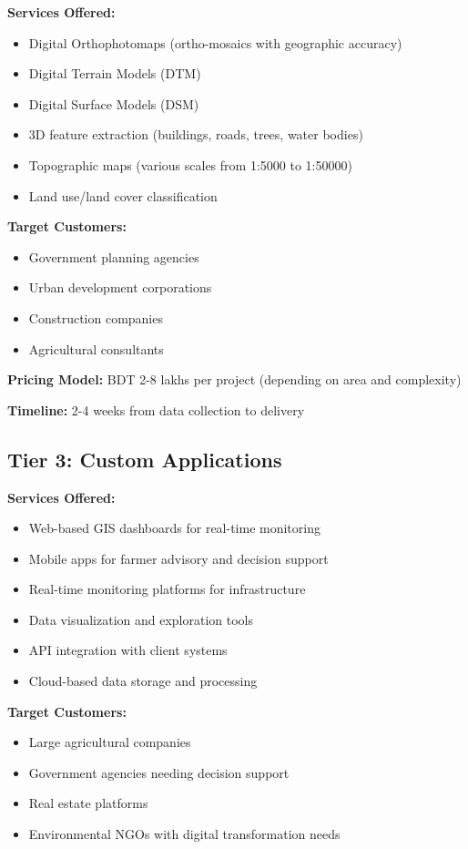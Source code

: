 \textbf{Services Offered:}
\begin{itemize}
    \item Digital Orthophotomaps (ortho-mosaics with geographic accuracy)
    \item Digital Terrain Models (DTM)
    \item Digital Surface Models (DSM)
    \item 3D feature extraction (buildings, roads, trees, water bodies)
    \item Topographic maps (various scales from 1:5000 to 1:50000)
    \item Land use/land cover classification
\end{itemize}

\textbf{Target Customers:}
\begin{itemize}
    \item Government planning agencies
    \item Urban development corporations
    \item Construction companies
    \item Agricultural consultants
\end{itemize}

\textbf{Pricing Model:} BDT 2-8 lakhs per project (depending on area and complexity)

\textbf{Timeline:} 2-4 weeks from data collection to delivery

\subsection{Tier 3: Custom Applications}

\textbf{Services Offered:}
\begin{itemize}
    \item Web-based GIS dashboards for real-time monitoring
    \item Mobile apps for farmer advisory and decision support
    \item Real-time monitoring platforms for infrastructure
    \item Data visualization and exploration tools
    \item API integration with client systems
    \item Cloud-based data storage and processing
\end{itemize}

\textbf{Target Customers:}
\begin{itemize}
    \item Large agricultural companies
    \item Government agencies needing decision support
    \item Real estate platforms
    \item Environmental NGOs with digital transformation needs
\end{itemize}

